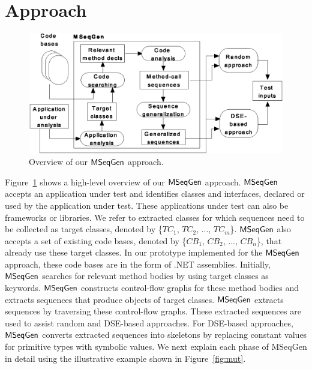 \section{Approach}
\label{sec:approach}

\begin{figure}[t]
\centering
\includegraphics[scale=0.75,clip]{figs/architecture1.eps}\vspace*{-1ex}
\caption{Overview of our $\textsf{MSeqGen} $ approach.} \label{fig:architecture}
\vspace*{-3ex}
\end{figure}

Figure~\ref{fig:architecture} shows a high-level overview of our $\textsf{MSeqGen} $ approach. $\textsf{MSeqGen} $ accepts an application under test and identifies classes and interfaces, declared or used by the application under test. These applications under test can also be frameworks or libraries. We refer to extracted classes for which sequences need to be collected as target classes, denoted by \{$TC_1$, $TC_2$, ..., $TC_m$\}. $\textsf{MSeqGen} $ also accepts a set of existing code bases, denoted by \{$CB_1$, $CB_2$, ..., $CB_n$\}, that already use these target classes. In our prototype implemented for the $\textsf{MSeqGen} $ approach, these code bases are in the form of .NET assemblies. Initially, $\textsf{MSeqGen} $ searches for relevant method bodies by using target classes as keywords. $\textsf{MSeqGen} $ constructs control-flow graphs for these method bodies and extracts sequences that produce objects of target classes. $\textsf{MSeqGen} $ extracts sequences by traversing these control-flow graphs. These extracted  sequences are used to assist random and DSE-based approaches. For DSE-based approaches, $\textsf{MSeqGen} $ converts extracted sequences into skeletons by replacing constant values for primitive types with symbolic values. We next explain each phase of MSeqGen in detail using the illustrative example shown in Figure~\ref{fig:mut}.

